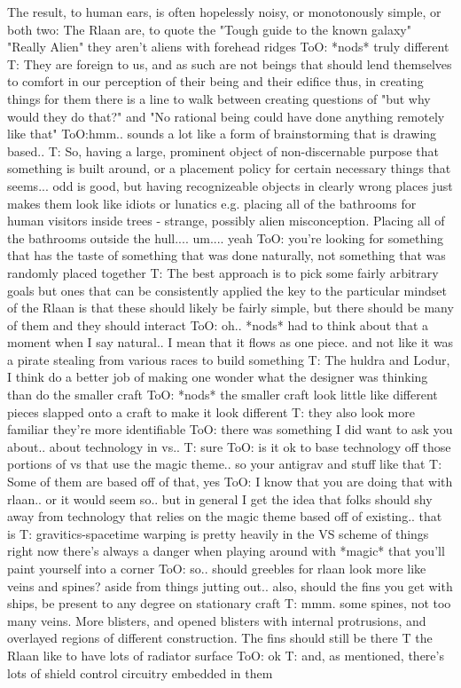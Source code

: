 The result, to human ears, is often hopelessly noisy, or monotonously simple, or both
two: The Rlaan are, to quote the "Tough guide to the known galaxy" "Really Alien"
they aren't aliens with forehead ridges
ToO: *nods* truly different
T: They are foreign to us, and as such are not beings that should lend themselves to comfort in our perception of their being and their edifice
thus, in creating things for them
there is a line to walk between creating questions of "but why would they do that?" and "No rational being could have done anything remotely like that"
ToO:hmm.. sounds a lot like a form of brainstorming that is drawing based.. 
T: So, having a large, prominent object of non-discernable purpose that something is built around, or a placement policy for certain necessary things that seems... odd is good, but having recognizeable objects in clearly wrong places just makes them look like idiots or lunatics
e.g. placing all of the bathrooms for human visitors inside trees - strange, possibly alien misconception. Placing all of the bathrooms outside the hull.... um.... yeah
ToO: you're looking for something that has the taste of something that was done naturally, not something that was randomly placed together
T: The best approach is to pick some fairly arbitrary goals
but ones that can be consistently applied
the key to the particular mindset of the Rlaan is that these should likely be fairly simple, but there should be many of them
and they should interact
ToO: oh.. *nods* had to think about that a moment
when I say natural.. I mean that it flows as one piece. and not like it was a pirate stealing from various races to build something 
T: The huldra and Lodur, I think do a better job of making one wonder what the designer was thinking than do the smaller craft
ToO: *nods* the smaller craft look little like different pieces slapped onto a craft to make it look different
T: they also look more familiar
they're more identifiable
ToO: there was something I did want to ask you about.. about technology in vs.. 
T: sure
ToO: is it ok to base technology off those portions of vs that use the magic theme.. so your antigrav and stuff like that
T: Some of them are based off of that, yes
ToO: I know that you are doing that with rlaan.. or it would seem so.. but in general I get the idea that folks should shy away from technology that relies on the magic theme
based off of existing.. that is
T: gravitics-spacetime warping is pretty heavily in the VS scheme of things right now
there's always a danger when playing around with *magic* that you'll paint yourself into a corner
ToO: so.. should greebles for rlaan look more like veins and spines?
aside from things jutting out.. 
also, should the fins you get with ships, be present to any degree on stationary craft
T: mmm. some spines, not too many veins. More blisters, and opened blisters with internal protrusions, and overlayed regions of different construction.
The fins should still be there
T the Rlaan like to have lots of radiator surface
ToO: ok
T: and, as mentioned, there's lots of shield control circuitry embedded in them

